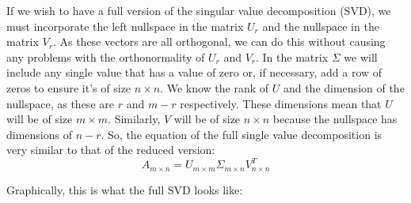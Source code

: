 \documentclass[a4,12pt,twosided,openany]{memoir}
\begin{document}
If we wish to have a full version of the singular value decomposition (SVD), we must incorporate the left nullspace in the matrix $U_r$ and the nullspace in the matrix $V_r$. As these vectors are all orthogonal, we can do this without causing any problems with the orthonormality of $U_r$ and $V_r$. In the matrix $\Sigma$ we will include any single value that has a value of zero or, if necessary, add a row of zeros to ensure it’s of size $n \times n$. We know the rank of $U$ and the dimension of the nullspace, as these are $r$ and $m−r$ respectively. These dimensions mean that $U$ will be of size $m \times m$. Similarly, $V$ will be of size $n \times n$ because the nullspace has dimensions of $n−r$. So, the equation of the full single value decomposition is very similar to that of the reduced version:
\begin{equation}
A_{m \times n} = U_{m \times m} \Sigma_{m \times n} V^T_{n \times n} 
\end{equation}
\par 
\indent
Graphically, this is what the full SVD looks like:
\end{document}
